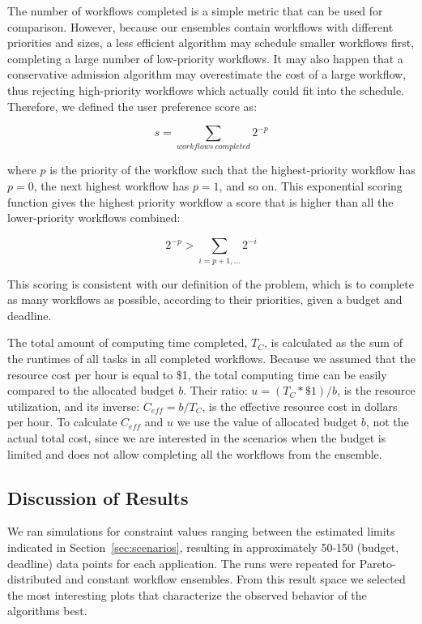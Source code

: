 \documentclass{sig-alternate}
\begin{document}
The number of workflows completed is a simple metric that can be used for
comparison. However, because our ensembles contain workflows with different 
priorities and sizes, a less efficient algorithm may schedule smaller
workflows first, completing a large number of low-priority workflows. It may 
also happen that a conservative admission algorithm may overestimate the cost 
of a large workflow, thus rejecting high-priority workflows which actually 
could fit into the schedule. Therefore, we defined the user preference score as:

\begin{equation}
\label{eq:score}
s = \sum_{workflows\ completed}{2^{-p}}
\end{equation}

where $p$ is the priority of the workflow such that the highest-priority workflow 
has $p=0$, the next highest workflow has $p=1$, and so on. This exponential scoring 
function gives the highest priority workflow a score that is higher than all the 
lower-priority workflows combined:

\begin{equation}
\label{eq:score-property}
2^{-p} > \sum_{i=p+1,\ldots}2^{-i}
\end{equation}

This scoring is consistent with our definition of the problem, which is to 
complete as many workflows as possible, according to their priorities, given 
a budget and deadline.

The total amount of computing time completed, $T_C$, is calculated as the sum 
of the runtimes of all tasks in all completed workflows. Because we assumed 
that the resource cost per hour is equal to \$1, the total computing time 
can be easily compared to the allocated budget $b$. Their ratio: 
$u = (T_C * \$1)/b$, is the resource utilization, and its inverse: 
$C_{eff} = b/T_C$, is the effective resource cost in dollars per hour. To
calculate $C_{eff}$ and $u$ we use the value of allocated budget $b$, not the
actual total cost, since we are interested in the scenarios when the budget is
limited and does not allow completing all the workflows from the ensemble.



\subsection{Discussion of Results}

We ran simulations for constraint values ranging between the estimated 
limits indicated in Section~\ref{sec:scenarios}, resulting in approximately 
50-150 (budget, deadline) data points for each application. The runs were
repeated for Pareto-distributed and constant workflow ensembles. From this result
space we selected the most interesting plots that characterize the observed 
behavior of the algorithms best.
\end{document}
